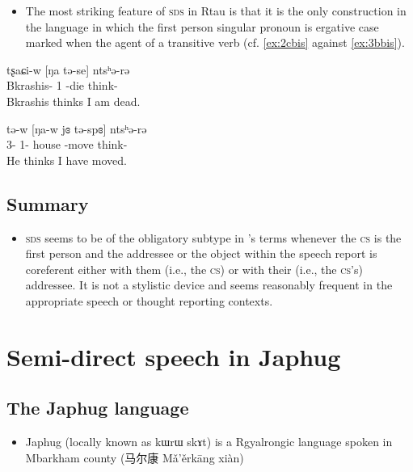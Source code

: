 \documentclass[oneside,a4paper,11pt]{article}
\newcommand{\ipa}[1]{{\phon #1}} %
\newcommand{\zh}[1]{{\cn #1}}
\newcommand{\ipapl}[1]{{\phondroit #1}}
\begin{document}
\begin{itemize}
 \item  The most striking feature of \textsc{sds} in Rtau is that it is the only construction in the language in which the first person singular pronoun is ergative case marked when the agent of a transitive verb (cf. \ref{ex:2cbis} against \ref{ex:3bbis}).
\end{itemize}

\begin{exe}

\ex \label{ex:2cbis}
\gll
	\ipa{tʂaɕi-w} [\ipapl{ŋa} \ipapl{tə-se}] \ipa{ntsʰə-rə}  \\
	{Bkrashis-\erg} {1\sg} {\prf-die} {think-\const}\\ 
	\glt Bkrashis thinks I am dead.

\ex \label{ex:3bbis}
\gll
	 \ipa{tə-w} [\ipapl{ŋa-w} \ipapl{jɞ} \ipapl{tə-spɞ}] \ipa{ntsʰə-rə}  \\
	  {3\sg-\erg} {1\sg-\erg} house {\prf-move} {think-\const}\\ 
	\glt He thinks I have moved.
\end{exe}




 \subsection{Summary}

\begin{itemize}
 \item \textsc{sds} seems to be of the obligatory subtype in \cite{aikhenvald08semidirect}'s terms whenever the \textsc{cs} is the first person and the addressee or the object within the speech report is coreferent either with them (i.e., the \textsc{cs}) or with their (i.e., the \textsc{cs}'s) addressee. It is not a stylistic device and seems reasonably frequent in the appropriate speech or thought reporting contexts.
\end{itemize}



\section{Semi-direct  speech in Japhug} 


\subsection{The Japhug language}


\begin{itemize}
 \item  Japhug (locally known as \ipa{kɯrɯ skɤt}) is a Rgyalrongic language spoken in Mbarkham county (\zh{马尔康} Mǎ'ěrkāng xiàn) 

 

\end{itemize}
\end{document}

